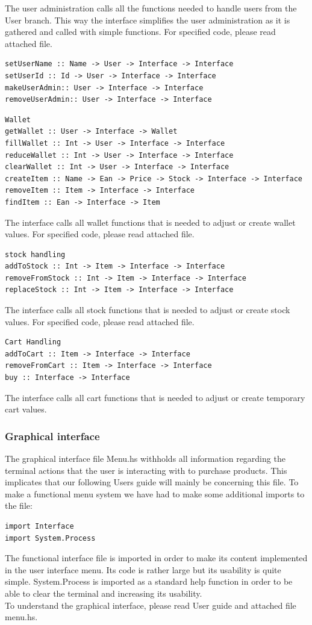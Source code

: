 \documentclass[11pt]{article}
\begin{document}
The user administration calls all the functions needed to handle users from the User branch. This way the interface simplifies the user administration as it is gathered and called with simple functions. For specified code, please read attached file.
\begin{lstlisting}
setUserName :: Name -> User -> Interface -> Interface
setUserId :: Id -> User -> Interface -> Interface
makeUserAdmin:: User -> Interface -> Interface
removeUserAdmin:: User -> Interface -> Interface
\end{lstlisting}
\begin{lstlisting}
Wallet
getWallet :: User -> Interface -> Wallet
fillWallet :: Int -> User -> Interface -> Interface
reduceWallet :: Int -> User -> Interface -> Interface
clearWallet :: Int -> User -> Interface -> Interface
createItem :: Name -> Ean -> Price -> Stock -> Interface -> Interface
removeItem :: Item -> Interface -> Interface
findItem :: Ean -> Interface -> Item
\end{lstlisting}
The interface calls all wallet functions that is needed to adjust or create wallet values. For specified code, please read attached file.
\begin{lstlisting}
stock handling
addToStock :: Int -> Item -> Interface -> Interface
removeFromStock :: Int -> Item -> Interface -> Interface
replaceStock :: Int -> Item -> Interface -> Interface
\end{lstlisting}
The interface calls all stock functions that is needed to adjust or create stock values. For specified code, please read attached file.
\begin{lstlisting}
Cart Handling
addToCart :: Item -> Interface -> Interface
removeFromCart :: Item -> Interface -> Interface
buy :: Interface -> Interface
\end{lstlisting}
The interface calls all cart functions that is needed to adjust or create temporary cart values.
\subsubsection{Graphical interface}
The graphical interface file Menu.hs withholds all information regarding the terminal actions that the user is interacting with to purchase products. This implicates that our following Users guide will mainly be concerning this file. To make a functional menu system we have had to make some additional imports to the file:
\begin{lstlisting}
import Interface
import System.Process
\end{lstlisting}
The functional interface file is imported in order to make its content implemented in the user interface menu. Its code is rather large but its usability is quite simple. System.Process is imported as a standard help function in order to be able to clear the terminal and increasing its usability.
\\
To understand the graphical interface, please read User guide and attached file menu.hs.
\newpage
\end{document}
